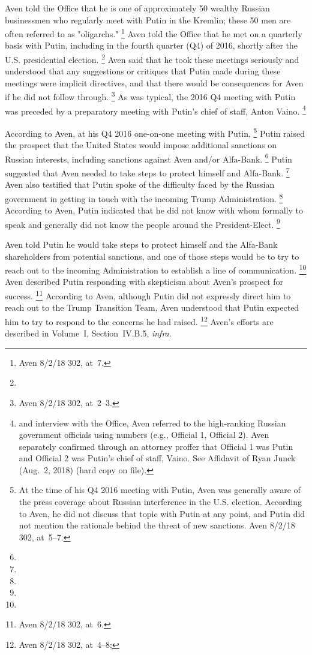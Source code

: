 Aven told the Office that he is one of approximately 50 wealthy Russian businessmen who regularly meet with Putin in the Kremlin; these 50 men are often referred to as "oligarchs."%
\footnote{Aven 8/2/18 302, at~7.}
Aven told the Office that he met on a quarterly basis with Putin, including in the fourth quarter (Q4) of 2016, shortly after the U.S. presidential election.%
\footnote{}
Aven said that he took these meetings seriously and understood that any suggestions or critiques that Putin made during these meetings were implicit directives, and that there would be consequences for Aven if he did not follow through.%
\footnote{Aven 8/2/18 302, at~2--3.}
As was typical, the 2016 Q4 meeting with Putin was preceded by a preparatory meeting with Putin's chief of staff, Anton Vaino.%
\footnote{ and interview with the Office, Aven referred to the high-ranking Russian government officials using numbers (e.g., Official 1, Official 2).
Aven separately confirmed through an attorney proffer that Official 1 was Putin and Official 2 was Putin's chief of staff, Vaino.
See Affidavit of Ryan Junck (Aug.~2, 2018) (hard copy on file).}

According to Aven, at his Q4 2016 one-on-one meeting with Putin,%
\footnote{At the time of his Q4 2016 meeting with Putin, Aven was generally aware of the press coverage about Russian interference in the U.S. election.
According to Aven, he did not discuss that topic with Putin at any point, and Putin did not mention the rationale behind the threat of new sanctions.
Aven 8/2/18 302, at~5--7.}
Putin raised the prospect that the United States would impose additional sanctions on Russian interests, including sanctions against Aven and/or Alfa-Bank.%
\footnote{}
Putin suggested that Aven needed to take steps to protect himself and Alfa-Bank.%
\footnote{}
Aven also testified that Putin spoke of the difficulty faced by the Russian government in getting in touch with the incoming Trump Administration.%
\footnote{}
According to Aven, Putin indicated that he did not know with whom formally to speak and generally did not know the people around the President-Elect.%
\footnote{}

Aven
told Putin he would take steps to protect himself and the Alfa-Bank shareholders from potential sanctions, and one of those steps would be to try to reach out to the incoming Administration to establish a line of communication.%
\footnote{}
Aven described Putin responding with skepticism about Aven's prospect for success.%
\footnote{ Aven 8/2/18 302, at~6.}
According to Aven, although Putin did not expressly direct him to reach out to the Trump Transition Team, Aven understood that Putin expected him to try to respond to the concerns he had raised.%
\footnote{Aven 8/2/18 302, at~4--8; }
Aven's efforts are described in Volume~I, Section~IV.B.5, \textit{infra}.

